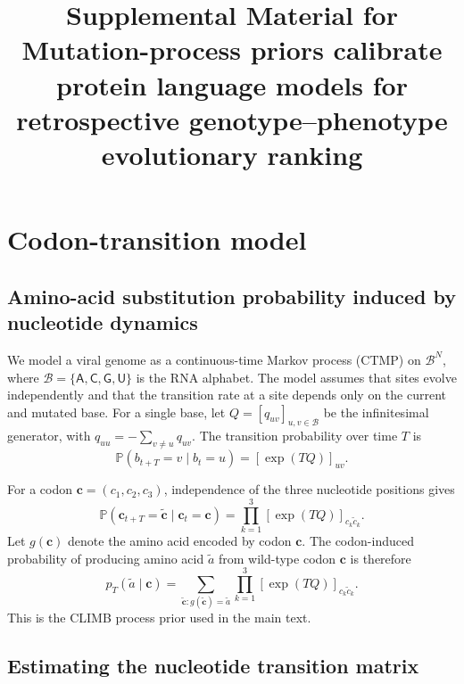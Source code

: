 \documentclass{article}
\title{\textbf{Supplemental Material for}\\
Mutation-process priors calibrate protein language models for retrospective genotype--phenotype evolutionary ranking}
\author{}
\date{}
\numberwithin{theorem}{section}
\begin{document}
\maketitle

\section{Codon-transition model}

\subsection{Amino-acid substitution probability induced by nucleotide dynamics}

We model a viral genome as a continuous-time Markov process (CTMP) on
$\mathcal{B}^N$, where $\mathcal{B}=\{\mathsf{A},\mathsf{C},\mathsf{G},\mathsf{U}\}$
is the RNA alphabet. The model assumes that sites evolve independently and that
the transition rate at a site depends only on the current and mutated base. For a
single base, let $Q=[q_{uv}]_{u,v\in\mathcal{B}}$ be the infinitesimal generator,
with $q_{uu}=-\sum_{v\neq u}q_{uv}$. The transition probability over time $T$ is
\begin{equation}
    \mathbb{P}(b_{t+T}=v\mid b_t=u)=[\exp(TQ)]_{uv}.
    \label{eq:supp-base-transition}
\end{equation}

For a codon $\mathbf{c}=(c_1,c_2,c_3)$, independence of the three nucleotide
positions gives
\begin{equation}
    \mathbb{P}(\mathbf{c}_{t+T}=\tilde{\mathbf{c}}\mid \mathbf{c}_t=\mathbf{c})
    =
    \prod_{k=1}^{3}[\exp(TQ)]_{c_k\tilde c_k}.
    \label{eq:supp-codon-transition}
\end{equation}
Let $g(\mathbf{c})$ denote the amino acid encoded by codon $\mathbf{c}$. The
codon-induced probability of producing amino acid $\tilde a$ from wild-type codon
$\mathbf{c}$ is therefore
\begin{equation}
    p_T(\tilde a\mid \mathbf{c})
    =
    \sum_{\tilde{\mathbf{c}}:g(\tilde{\mathbf{c}})=\tilde a}
    \prod_{k=1}^{3}[\exp(TQ)]_{c_k\tilde c_k}.
    \label{eq:supp-aa-prob}
\end{equation}
This is the CLIMB process prior used in the main text.

\subsection{Estimating the nucleotide transition matrix}
\end{document}
